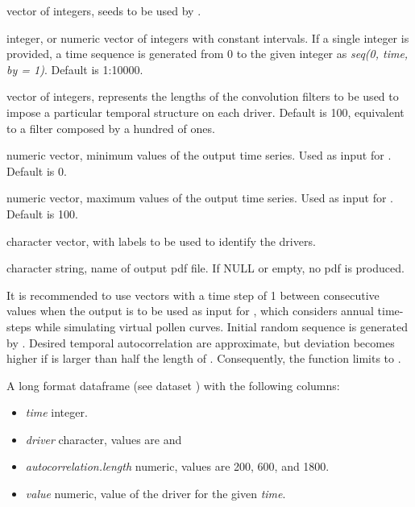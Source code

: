 \documentclass[letterpaper]{book}
\begin{document}
\begin{Arguments}
\begin{ldescription}
\item[\code{random.seeds}] vector of integers, seeds to be used by .

\item[\code{time}] integer, or numeric vector of integers with constant intervals. If a single integer is provided, a time sequence is generated from 0 to the given integer as \emph{seq(0, time, by = 1)}. Default is 1:10000.

\item[\code{autocorrelation.lengths}] vector of integers, represents the lengths of the convolution filters to be used to impose a particular temporal structure on each driver. Default is 100, equivalent to a filter composed by a hundred of ones.

\item[\code{output.min}] numeric vector, minimum values of the output time series. Used as input for . Default is 0.

\item[\code{output.max}] numeric vector, maximum values of the output time series. Used as input for . Default is 100.

\item[\code{driver.names}] character vector, with labels to be used to identify the drivers.

\item[\code{filename}] character string, name of output pdf file. If NULL or empty, no pdf is produced.
\end{ldescription}
\end{Arguments}
%
\begin{Details}\relax
It is recommended to use  vectors with a time step of 1 between consecutive values when the output is to be used as input for , which considers annual time-steps while simulating virtual pollen curves. Initial random sequence is generated by . Desired temporal autocorrelation are approximate, but deviation becomes higher if  is larger than half the length of . Consequently, the function limits  to .
\end{Details}
%
\begin{Value}
A long format dataframe (see dataset ) with the following columns:

\begin{itemize}

\item \emph{time} integer.
\item \emph{driver} character, values are  and 
\item \emph{autocorrelation.length} numeric, values are 200, 600, and 1800.
\item \emph{value} numeric, value of the driver for the given \emph{time}.

\end{itemize}

\end{Value}
\end{document}
